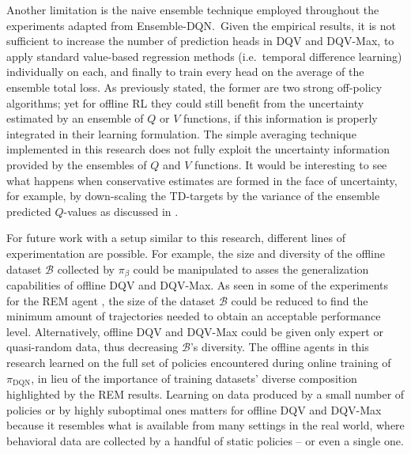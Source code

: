 Another limitation is the naive ensemble technique employed throughout
the experiments adapted from Ensemble-DQN.\ Given the empirical
results, it is not sufficient to increase the number of prediction
heads in DQV and DQV-Max, to apply standard value-based regression
methods (i.e.\ temporal difference learning) individually on each,
and finally to train every head on the average of the ensemble total
loss. As previously stated, the former are two strong off-policy
algorithms; yet for
offline RL they could still benefit from the uncertainty estimated by
an ensemble of $Q$ or $V$ functions, if this information is properly
integrated in their learning formulation. The simple averaging technique
implemented in this research does not fully exploit the uncertainty
information provided by the ensembles of $Q$ and $V$ functions. It
would be interesting to see what happens when conservative estimates
are formed in the face of uncertainty, for example, by down-scaling
the TD-targets by the variance of the ensemble predicted $Q$-values as
discussed in \citet{levine2020offline}.

For future work with a setup similar to this research, different lines
of experimentation are possible. For example, the size and diversity
of the offline dataset $\mathcal{B}$ collected by $\pi_{\beta}$ could
be manipulated to asses the generalization capabilities of offline DQV
and DQV-Max. As seen in some of the experiments for the REM agent
\citep{agarwal2020optimistic}, the size of the dataset $\mathcal{B}$
could be reduced to find the minimum amount of trajectories needed to
obtain an acceptable performance level. Alternatively, offline DQV and
DQV-Max could be
given only expert or quasi-random data, thus decreasing $\mathcal{B}$'s
diversity. The offline agents in this research learned on the full set
of policies encountered during online training of $\pi_{\textrm{DQN}}$,
in lieu of the importance of training datasets' diverse composition
highlighted by the REM results.
Learning on data produced by a small number of policies or by
highly suboptimal ones matters for offline DQV and DQV-Max because it
resembles what is available from many settings in the real world,
where behavioral data are collected by a handful of static policies --
or even a single one.

